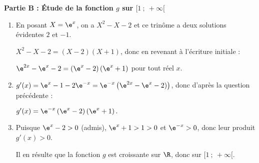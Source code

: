 \bigskip

\textbf{Partie B : Étude de la fonction $g$ sur $[1~;~+\infty[$}

\medskip

\begin{enumerate}
\item %

En posant $X = \e^x$, on a $X^2 - X - 2$ et ce trinôme a deux solutions évidentes $2$ et $- 1$.

$X^2 - X - 2 = (X - 2)(X + 1)$, donc en revenant à l'écriture initiale :

$\e^{2x} - \e^x - 2 = \left(\e^x - 2\right)\left(\e^x + 1\right)$ pour tout réel $x$.
\item %
$g'(x) = \e^x - 1 - 2\e^{-x} = \e^{-x}\left(\e^{2x} - \e^{x} - 2)\right)$, donc d'après la question précédente :

$g'(x) = \e^{-x}\left(\e^x - 2\right)\left(\e^x + 1\right).$
\item %
Puisque $\e^x - 2 > 0$ (admis), $\e^x + 1 > 1 > 0$  et $\e^{-x} > 0$, donc leur produit $g'(x) > 0$.

Il en résulte que la fonction $g$ est croissante sur $\R$, donc sur $[1~;~ +\infty[$.
\end{enumerate}

